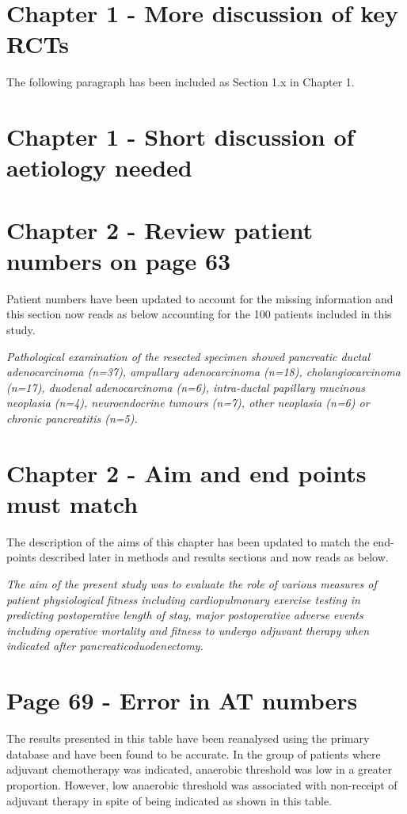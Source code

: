 \documentclass[12pt,a4paper]{article}
\author{Vishnu V Chandrabalan}
\begin{document}
 
		
\section{Chapter 1 - More discussion of key RCTs}
		
The following paragraph has been included as Section 1.x in Chapter 1.
		
\section{Chapter 1 - Short discussion of aetiology needed}
		
\section{Chapter 2 - Review patient numbers on page 63}

Patient numbers have been updated to account for the missing information and this section now reads as below accounting for the 100 patients included in this study.

\textit{Pathological examination of the resected specimen showed pancreatic ductal adenocarcinoma (n=37), ampullary adenocarcinoma (n=18), cholangiocarcinoma (n=17), duodenal adenocarcinoma (n=6), intra-ductal papillary mucinous neoplasia (n=4), neuroendocrine tumours (n=7), other neoplasia (n=6) or chronic pancreatitis (n=5).}

\section{Chapter 2 - Aim and end points must match}

The description of the aims of this chapter has been updated to match the end-points described later in methods and results sections and now reads as below.

\textit{The aim of the present study was to evaluate the role of various measures of patient physiological fitness including cardiopulmonary exercise testing in predicting postoperative length of stay, major postoperative adverse events including operative mortality and fitness to undergo adjuvant therapy when indicated after pancreaticoduodenectomy.}

\section{Page 69 - Error in AT numbers}

The results presented in this table have been reanalysed using the primary database and have been found to be accurate. In the group of patients where adjuvant chemotherapy was indicated, anaerobic threshold was low in a greater proportion. However, low anaerobic threshold was associated with non-receipt of adjuvant therapy in spite of being indicated as shown in this table.
\end{document}
